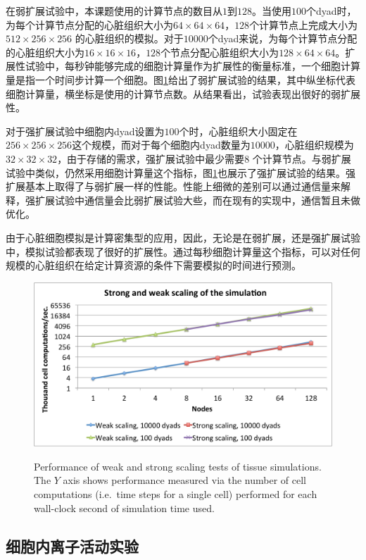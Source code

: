 在弱扩展试验中，本课题使用的计算节点的数目从$1$到$128$。当使用$100$个dyad时，为每个计算节点分配的心脏组织大小为$64\times64\times64$，$128$个计算节点上完成大小为$512\times256\times256$ 的心脏组织的模拟。对于$10000$个dyad来说，为每个计算节点分配的心脏组织大小为$16\times16\times16$，$128$个节点分配心脏组织大小为$128\times64\times64$。扩展性试验中，每秒钟能够完成的细胞计算量作为扩展性的衡量标准，一个细胞计算量是指一个时间步计算一个细胞。图\ref{scaling}给出了弱扩展试验的结果，其中纵坐标代表细胞计算量，横坐标是使用的计算节点数。从结果看出，试验表现出很好的弱扩展性。

对于强扩展试验中细胞内dyad设置为$100$个时，心脏组织大小固定在$256\times256\times256$这个规模，而对于每个细胞内dyad数量为$10000$，心脏组织规模为$32\times32\times32$，由于存储的需求，强扩展试验中最少需要$8$ 个计算节点。与弱扩展试验中类似，仍然采用细胞计算量这个指标，图\ref{scaling}也展示了强扩展试验的结果。强扩展基本上取得了与弱扩展一样的性能。性能上细微的差别可以通过通信量来解释，强扩展试验中通信量会比弱扩展试验大些，而在现有的实现中，通信暂且未做优化。

由于心脏细胞模拟是计算密集型的应用，因此，无论是在弱扩展，还是强扩展试验中，模拟试验都表现了很好的扩展性。通过每秒细胞计算量这个指标，可以对任何规模的心脏组织在给定计算资源的条件下需要模拟的时间进行预测。

\begin{figure}[htb]
\center
\includegraphics[width=\textwidth]{figs/scaling.pdf}
\label{scaling}
\caption{Performance of weak and strong scaling tests of tissue simulations. The $Y$ axis shows performance measured via the number of cell computations (i.e.~time steps for a single cell) performed for each wall-clock second of simulation time used. }
\end{figure} 


\subsection{细胞内离子活动实验}

